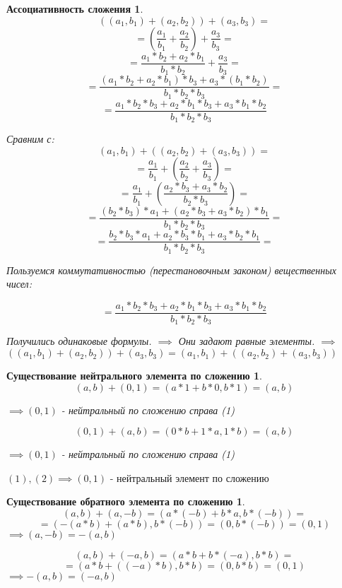 \documentclass[14pt,a4paper,oneside,russian]{article}
\newtheorem*{axiom1}{Ассоциативность сложения}
\newtheorem*{axiom2}{Существование нейтрального элемента по сложению}
\newtheorem*{axiom3}{Существование обратного элемента по сложению}
\begin{document}
\begin{axiom1}
$$ ((a_1, b_1) + (a_2, b_2)) + (a_3, b_3) = $$
$$ = (\frac{a_1}{b_1} + \frac{a_2}{b_2}) + \frac{a_3}{b_3} = $$
$$ = \frac{a_1 * b_2 + a_2 * b_1}{b_1 * b_2} + \frac{a_3}{b_3} = $$
$$ = \frac{(a_1 * b_2 + a_2 * b_1) * b_3 + a_3 * (b_1 * b_2)}{b_1 * b_2 * b_3} = $$
$$ = \frac{a_1 * b_2 * b_3 + a_2 * b_1 * b_3 + a_3 * b_1 * b_2}{b_1 * b_2 * b_3} $$

Сравним с:
$$ ( a_1, b_1 ) + (( a_2, b_2 ) + ( a_3, b_3 )) = $$
$$ = \frac{a_1}{b_1} + (\frac{a_2}{b_2} + \frac{a_3}{b_3}) = $$
$$ = \frac{a_1}{b_1} + (\frac{a_2 * b_3 + a_3 * b_2}{b_2 * b_3}) = $$
$$ = \frac{(b_2 * b_3) * a_1 + (a_2 * b_3 + a_3 * b_2) * b_1}{b_1 * b_2 * b_3} = $$
$$ = \frac{b_2 * b_3 * a_1 + a_2 * b_3 * b_1 + a_3 * b_2 * b_1}{b_1 * b_2 * b_3} =  $$

Пользуемся коммутативностью (перестановочным законом) вещественных чисел:

$$ = \frac{a_1 * b_2 * b_3 + a_2 * b_1 * b_3 + a_3 * b_1 * b_2}{b_1 * b_2 * b_3} $$

Получились одинаковые формулы. $ \implies $ Они задают равные элементы. $ \implies $
$ ((a_1, b_1) + (a_2, b_2)) + (a_3, b_3) = (a_1, b_1) + ((a_2, b_2) + (a_3, b_3)) $

\end{axiom1}
\newpage

\begin{axiom2}
$$ (a, b) + (0, 1) = (a * 1 + b * 0, b * 1) = (a, b) $$
\begin{center}
$ \implies (0, 1) $ - нейтральный по сложению справа (1)
\end{center}
$$ (0, 1) + (a, b) = (0 * b + 1 * a, 1 * b) = (a, b) $$
\begin{center}
$ \implies (0, 1) $ - нейтральный по сложению справа (1)
\end{center}
\end{axiom2}

$ (1), (2) \implies (0, 1) $ - нейтральный элемент по сложению
\newpage

\begin{axiom3}
$$ (a, b) + (a, -b) = (a * (-b) + b * a, b * (-b)) = $$
$$ = ( -(a * b) + (a * b), b * (-b) ) = (0, b * (-b)) = (0, 1) $$
$ \implies (a, -b) = -(a, b) $

$$ (a, b) + (-a, b) = (a * b + b * (-a), b * b) = $$
$$ = (a * b + ((-a) * b), b * b) = (0, b * b) = (0, 1) $$
$ \implies -(a, b) = (-a, b) $
\end{axiom3}
\end{document}
